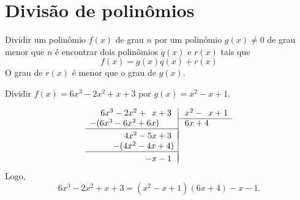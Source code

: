 \section{Divisão de polinômios}

Dividir um polinômio $f(x)$ de grau $n$ por um polinômio $g(x)\neq 0$ de grau
menor que $n$ é encontrar dois polinômios $q(x)$ e $r(x)$ tais que
\[
  f(x) = g(x) q(x) + r(x)
\]
O grau de $r(x)$ é menor que o grau de $g(x)$.

\begin{example}
  Dividir $f(x)=6x^3-2x^2+x+3$ por $g(x)=x^2-x+1$.

  \solution
  \[
    \begin{array}{r|l}
        6x^3 - 2x^2 + \phantom{6}x + 3 \; & \; x^2 - \phantom{6}x + 1 \\ \cline{2-2}
      -(6x^3 - 6x^2 + 6x) \phantom{{}+3}  & \; 6x + 4                 \\ \cline{1-1}
                                          &  \\[\dimexpr-\normalbaselineskip+\jot]
        4x^2 - 5x + 3                  \; &  \\
      -(4x^2 - 4x + 4)                    &  \\ \cline{1-1}
                                          &  \\[\dimexpr-\normalbaselineskip+\jot]
      -  x - 1                         \; &
    \end{array}
  \]
  Logo,
  \[
    6x^3 - 2x^2 + x+3 = (x^2-x+1)(6x+4) - x-1.
  \]
\end{example}

